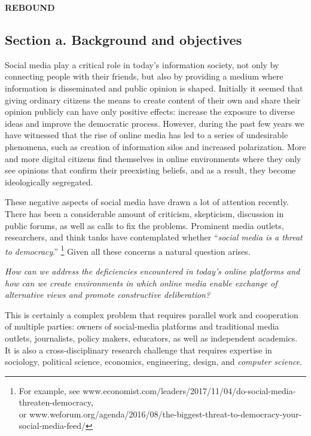 \documentclass[a4paper,11pt]{article}
\begin{document}
\newpage
\begin{center}

{\LARGE\bf REBOUND} %
\end{center}


\subsection*{Section a. Background and objectives}

Social media play a critical role in today's information society, 
not only by connecting people with their friends, 
but also by providing a medium where information is disseminated and public opinion is shaped.
Initially it seemed that giving ordinary citizens the means to create content of their own
and share their opinion publicly 
can have only positive effects: increase the exposure to diverse ideas
and improve the democratic process.
However, during the past few years we have witnessed that
the rise of online media has led to 
a series of undesirable phenomena, 
such as creation of information silos and increased polarization.
More and more digital citizens find themselves in online environments
where they only see opinions that confirm their preexisting beliefs,
and as a result, they become ideologically segregated.

\smallskip
These negative aspects of social media have drawn a lot of attention recently.
There has been a considerable amount of criticism, skepticism, 
discussion in public forums, as well as calls %
to fix the problems. 
Prominent media outlets, researchers, and think tanks have contemplated whether 
``{\em social media is a threat to democracy}.''%
\footnote{For example, see www.economist.com/leaders/2017/11/04/do-social-media-threaten-democracy,\\
or www.weforum.org/agenda/2016/08/the-biggest-threat-to-democracy-your-social-media-feed/}
Given all these concerns a natural question arises.

\smallskip
{\em How can we address the deficiencies encountered in today's online platforms  
and how can we create environments in which online media 
enable exchange of alternative views and promote constructive deliberation?}

\smallskip
This is certainly a complex problem that requires
parallel work and cooperation of multiple parties: 
owners of social-media platforms and
traditional media outlets, 
journalists,
policy makers, 
educators, 
as well as independent academics. 
It is also a cross-disciplinary research challenge that requires expertise in 
sociology, political science, economics, engineering, design, and {\em computer science}.
\end{document}
